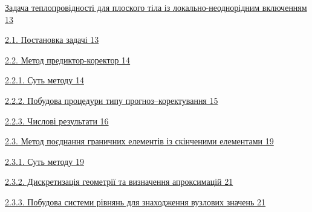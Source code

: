 \protect\hyperlink{ux437ux430ux434ux430ux447ux430-ux442ux435ux43fux43bux43eux43fux440ux43eux432ux456ux434ux43dux43eux441ux442ux456-ux434ux43bux44f-ux43fux43bux43eux441ux43aux43eux433ux43e-ux442ux456ux43bux430-ux456ux437-ux43bux43eux43aux430ux43bux44cux43dux43e-ux43dux435ux43eux434ux43dux43eux440ux456ux434ux43dux438ux43c-ux432ux43aux43bux44eux447ux435ux43dux43dux44fux43c}{Задача
теплопровідності для плоского тіла із локально-неоднорідним включенням
13}

\protect\hyperlink{ux43fux43eux441ux442ux430ux43dux43eux432ux43aux430-ux437ux430ux434ux430ux447ux456}{2.1.
Постановка задачі 13}

\protect\hyperlink{ux43cux435ux442ux43eux434-ux43fux440ux435ux434ux438ux43aux442ux43eux440-ux43aux43eux440ux435ux43aux442ux43eux440}{2.2.
Метод предиктор-коректор 14}

\protect\hyperlink{ux441ux443ux442ux44c-ux43cux435ux442ux43eux434ux443}{2.2.1.
Суть методу 14}

\protect\hyperlink{ux43fux43eux431ux443ux434ux43eux432ux430-ux43fux440ux43eux446ux435ux434ux443ux440ux438-ux442ux438ux43fux443-ux43fux440ux43eux433ux43dux43eux437ux43aux43eux440ux435ux43aux442ux443ux432ux430ux43dux43dux44f}{2.2.2.
Побудова процедури типу прогноз--коректування 15}

\protect\hyperlink{ux447ux438ux441ux43bux43eux432ux456-ux440ux435ux437ux443ux43bux44cux442ux430ux442ux438}{2.2.3.
Числові результати 16}

\protect\hyperlink{ux43cux435ux442ux43eux434-ux43fux43eux454ux434ux43dux430ux43dux43dux44f-ux433ux440ux430ux43dux438ux447ux43dux438ux445-ux435ux43bux435ux43cux435ux43dux442ux456ux432-ux456ux437-ux441ux43aux456ux43dux447ux435ux43dux438ux43cux438-ux435ux43bux435ux43cux435ux43dux442ux430ux43cux438}{2.3.
Метод поєднання граничних елементів із скінченими елементами 19}

\protect\hyperlink{ux441ux443ux442ux44c-ux43cux435ux442ux43eux434ux443-1}{2.3.1.
Суть методу 19}

\protect\hyperlink{ux434ux438ux441ux43aux440ux435ux442ux438ux437ux430ux446ux456ux44f-ux433ux435ux43eux43cux435ux442ux440ux456ux457-ux442ux430-ux432ux438ux437ux43dux430ux447ux435ux43dux43dux44f-ux430ux43fux440ux43eux43aux441ux438ux43cux430ux446ux456ux439}{2.3.2.
Дискретизація геометрії та визначення апроксимацій 21}

\protect\hyperlink{ux43fux43eux431ux443ux434ux43eux432ux430-ux441ux438ux441ux442ux435ux43cux438-ux440ux456ux432ux43dux44fux43dux44c-ux434ux43bux44f-ux437ux43dux430ux445ux43eux434ux436ux435ux43dux43dux44f-ux432ux443ux437ux43bux43eux432ux438ux445-ux437ux43dux430ux447ux435ux43dux44c}{2.3.3.
Побудова системи рівнянь для знаходження вузлових значень 21}

